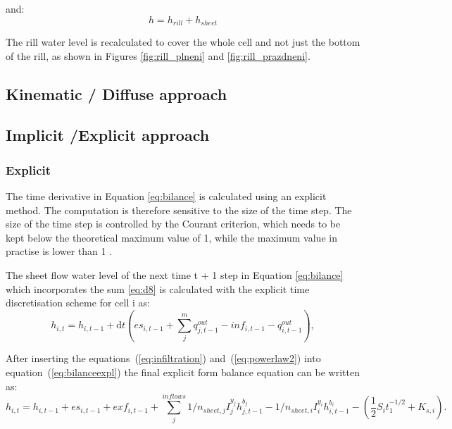             and:
            \begin{equation}
               h = h_{rill} + h_{sheet}  
            \end{equation}

            The rill water level is recalculated to cover the whole cell and not just the
            bottom of the rill, as shown in Figures \ref{fig:rill_plneni} and
            \ref{fig:rill_prazdneni}.
 

    \subsection{Kinematic / Diffuse approach}
    

    \FloatBarrier
    \subsection{Implicit /Explicit approach}

        \subsubsection{Explicit}
            The time derivative in Equation \ref{eq:bilance} is calculated using an
            explicit method. The computation is therefore sensitive to the size of the time
            step. The size of the time step is controlled by the Courant criterion, which
            needs to be kept below the theoretical maximum value of 1, while the maximum
            value in practise is lower than 1 
            \cite{zhang1989modeling, esteves2000overland}.


            The sheet flow water level of the next time t + 1 step in Equation
            \ref{eq:bilance} which incorporates the sum \ref{eq:d8} is calculated with the
            explicit time discretisation scheme for cell i as:
            \begin{equation} 
            h_{i,t} =h_{i,t-1} + \mathrm{d}t (es_{i,t-1} + \sum_j^m q^{out}_{j,t-1}-
            inf_{i,t-1} - q^{out}_{i,t-1}),
            \label{eq:bilanceexpl}
            \end{equation}


           After inserting the equations~(\ref{eq:infiltration})
           and~(\ref{eq:powerlaw2}) into equation~(\ref{eq:bilanceexpl}) the
           final explicit form balance equation can be written as:
            \begin{dmath}
              h_{i,t} = h_{i,t-1} +
              es_{i,t-1}  + exf_{i,t-1} +  \sum_{j}^{inflows}
              1/n_{sheet,j}I_j^{y_j} h_{j,t-1}^{b_j} -
              1/n_{sheet,i}I_i^{y_i}h_{i,t-1}^{b_i} - ( 
              \frac{1}{2}S_it_1^{-1/2}+K_{s,i}).
            \end{dmath}


